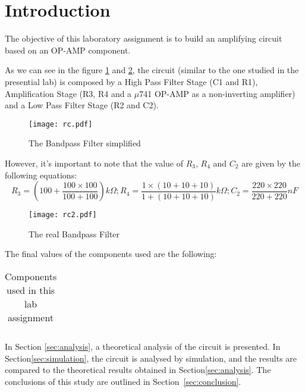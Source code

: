 \section{Introduction}
\label{sec:introduction}

The objective of this laboratory assignment is to build an amplifying circuit based on an OP-AMP component.

As we can see in the figure \ref{fig:rc} and \ref{fig:rc2}, the circuit (similar to the one studied in the presential lab) is composed by a High Pass Filter Stage (C1 and R1), Amplification Stage (R3, R4 and a $\mu$741 OP-AMP as a non-inverting amplifier) and a Low Pass Filter Stage (R2 and C2).

\begin{figure}[h] \centering
\texttt{[image: rc.pdf]}
\vspace{-5mm}
\caption{The Bandpass Filter simplified}\label{fig:rc}
\end{figure}

However, it's important to note that the value of $R_3$, $R_4$ and $C_2$ are given by the following equations:
\begin{equation}
 R_3= \left( 100+ \frac{100\times100}{100+100}\right) k\Omega;     
 R_4= \frac{1\times(10+10+10)}{1+(10+10+10)} k\Omega;     
 C_2=\frac{220\times220}{220+220} nF
 \end{equation}

\begin{figure}[h] \centering
\texttt{[image: rc2.pdf]}
\vspace{-5mm}
\caption{The real Bandpass Filter }\label{fig:rc2}
\end{figure}

The final values of the components used are the following:

\begin{table}[!htb]
\centering
  \begin{tabular}{|c|c|}
    \hline    
    
 \end{tabular}
 \caption{Components used in this lab assignment}\label{tab:components}
\end{table}


In Section \ref{sec:analysis}, a theoretical analysis of the circuit is presented. In Section\ref{sec:simulation}, the circuit is analysed by simulation, and the results are compared to the theoretical results obtained in Section\ref{sec:analysis}. The conclusions of this study are outlined in Section~\ref{sec:conclusion}.







